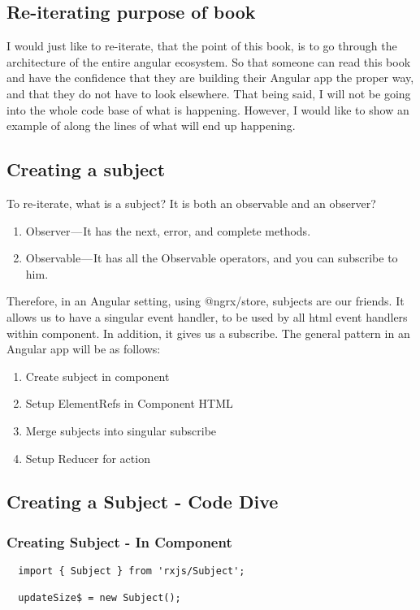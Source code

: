 \subsection{ Re-iterating purpose of book }

I would just like to re-iterate, that the point of this book, is to go through
the architecture of the entire angular ecosystem. So that someone can read this
book and have the confidence that they are building their Angular app the proper
way, and that they do not have to look elsewhere. That being said, I will not be
going into the whole code base of what is happening. However, I would like to show
an example of along the lines of what will end up happening.

\subsection{ Creating a subject }

To re-iterate, what is a subject? It is both an observable and an observer?
\begin{enumerate}
  \item Observer — It has the next, error, and complete methods.
  \item Observable — It has all the Observable operators, and you can subscribe
  to him.
\end{enumerate}

Therefore, in an Angular setting, using @ngrx/store, subjects are our friends. It
allows us to have a singular event handler, to be used by all html event handlers
within component. In addition, it gives us a subscribe. The general pattern in
an Angular app will be as follows:
\begin{enumerate}
  \item Create subject in component
  \item Setup ElementRefs in Component HTML
  \item Merge subjects into singular subscribe
  \item Setup Reducer for action
\end{enumerate}

\subsection{ Creating a Subject - Code Dive }

\subsubsection{ Creating Subject - In Component }
\begin{lstlisting}
  import { Subject } from 'rxjs/Subject';

  updateSize$ = new Subject();
\end{lstlisting}

